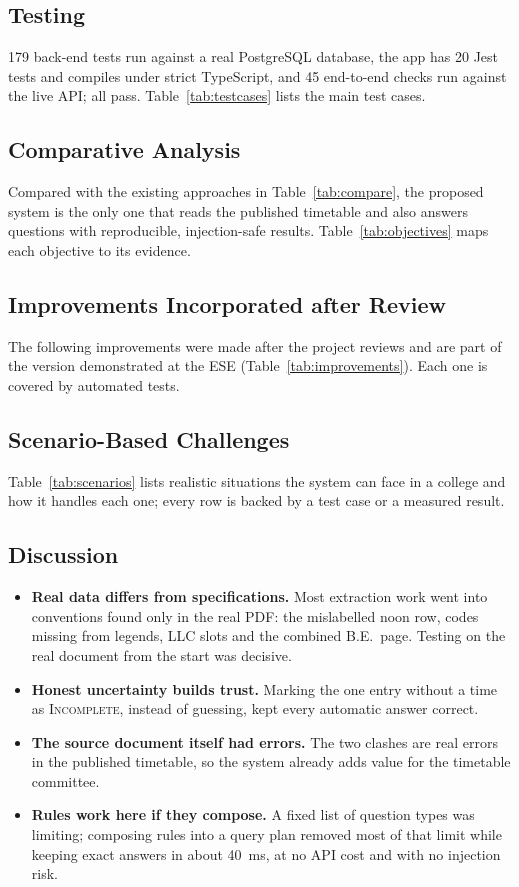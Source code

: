 \subsection{Testing}
179 back-end tests run against a real PostgreSQL database, the app has 20 Jest tests and compiles
under strict TypeScript, and 45 end-to-end checks run against the live API; all pass.
Table~\ref{tab:testcases} lists the main test cases.


\subsection{Comparative Analysis}
Compared with the existing approaches in Table~\ref{tab:compare}, the proposed system is the only one
that reads the published timetable and also answers questions with reproducible, injection-safe
results. Table~\ref{tab:objectives} maps each objective to its evidence.


\subsection{Improvements Incorporated after Review}
The following improvements were made after the project reviews and are part of the version
demonstrated at the ESE (Table~\ref{tab:improvements}). Each one is covered by automated tests.


\subsection{Scenario-Based Challenges}
Table~\ref{tab:scenarios} lists realistic situations the system can face in a college and how it
handles each one; every row is backed by a test case or a measured result.


\subsection{Discussion}
\begin{itemize}
\item \textbf{Real data differs from specifications.} Most extraction work went into conventions found
      only in the real PDF: the mislabelled noon row, codes missing from legends, LLC slots and the
      combined B.E.\ page. Testing on the real document from the start was decisive.
\item \textbf{Honest uncertainty builds trust.} Marking the one entry without a time as
      \textsc{Incomplete}, instead of guessing, kept every automatic answer correct.
\item \textbf{The source document itself had errors.} The two clashes are real errors in the
      published timetable, so the system already adds value for the timetable committee.
\item \textbf{Rules work here if they compose.} A fixed list of question types was limiting; composing
      rules into a query plan removed most of that limit while keeping exact answers in about 40~ms,
      at no API cost and with no injection risk.
\end{itemize}
\newpage
